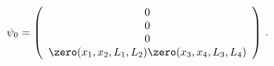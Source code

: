 \begin{equation}
\label{Dirac-zero-D4}
\psi_0 = \left( \begin{array}{c}
                 0 \\
		 0 \\
		 0 \\
		 \zero(x_1,x_2,L_1,L_2) 
		 \zero(x_3,x_4,L_3,L_4)
		 \end{array} \right) \, .
\end{equation} 
